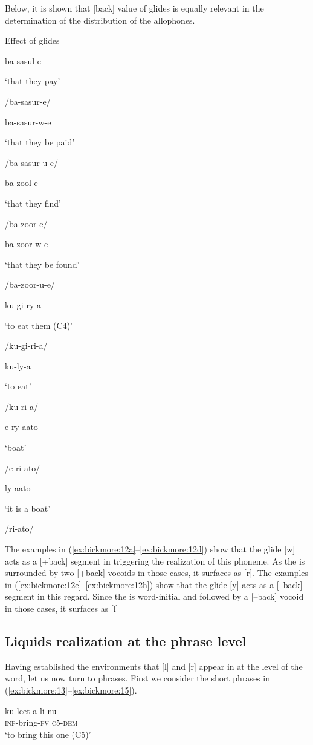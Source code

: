 \documentclass[output=paper,modfonts,nonflat,
colorlinks, citecolor=brown,
draftmode,
]{langsci/langscibook}
\begin{document}
Below, it is shown that [back] value of glides is equally relevant in the determination of the distribution of the  allophones. 


\renewcommand{\downingtriple}[3]{\parbox{3.5cm}{#1}\parbox{4cm}{#2}\parbox{3cm}{#3}}
\ea\label{ex:bickmore:12}
Effect of glides
\ea\label{ex:bickmore:12a}
\downingtriple{ba-sasul-e}{‘that they pay’}{/ba-sasur-e/}
\ex\label{ex:bickmore:12b}
\downingtriple{ba-sasur-w-e}{‘that they be paid’}{/ba-sasur-u-e/}
\ex\label{ex:bickmore:12c}
\downingtriple{ba-zool-e}{‘that they find’}{/ba-zoor-e/}
\ex\label{ex:bickmore:12d}
\downingtriple{ba-zoor-w-e}{‘that they be found’}{/ba-zoor-u-e/}
\ex\label{ex:bickmore:12e}
\downingtriple{ku-gi-ry-a}{‘to eat them (C4)’}{/ku-gi-ri-a/}
\ex\label{ex:bickmore:12f}
\downingtriple{ku-ly-a}{‘to eat’}{/ku-ri-a/}
\ex\label{ex:bickmore:12g}
\downingtriple{e-ry-aato}{‘boat’}{/e-ri-ato/}
\ex\label{ex:bickmore:12h}
\downingtriple{ly-aato}{‘it is a boat’}{/ri-ato/}
\z
\z
%

\renewcommand{\downingtriple}[3]{\parbox{4.5cm}{#1}\parbox{3cm}{#2}\parbox{3cm}{#3}}

The examples in (\ref{ex:bickmore:12a}--\ref{ex:bickmore:12d}) show that the glide [w] acts as a [+back] segment in triggering the realization of this  phoneme. As the  is surrounded by two [+back] vocoids in those cases, it surfaces as [r]. The examples in (\ref{ex:bickmore:12e}--\ref{ex:bickmore:12h}) show that the glide [y] acts as a [--back] segment in this regard. Since the  is word-initial and followed by a [--back] vocoid in those cases, it surfaces as [l]

\subsection{Liquids realization at the phrase level}

Having established the environments that [l] and [r] appear in at the level of the word, let us now turn to phrases. First we consider the short phrases in (\ref{ex:bickmore:13}--\ref{ex:bickmore:15}).

\ea\label{ex:bickmore:13}
\gll  ku-leet-a li-nu  \\
\textsc{inf-}\textup{bring}\textsc{-fv} \textsc{c5-dem}\\
\glt  ‘to bring this one (C5)’  
\z
\end{document}
